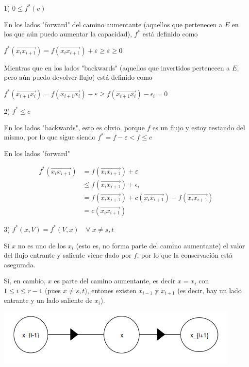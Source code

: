 \documentclass[10pt,a4paper]{article}
\begin{document}
1) $0 \leq f^* (v)$

En los lados "forward" del camino aumentante (aquellos que pertenecen a $E$ en los que aún puedo aumentar la capacidad), $f^*$ está definido como

\begin{center}
$f^*(\overrightarrow{x_ix_{i+1}}) = f(\overrightarrow{x_ix_{i+1}})+\varepsilon \geq \varepsilon \geq 0 $
\end{center}

Mientras que en los lados "backwards" (aquellos que invertidos pertenecen a $E$, pero aún puedo devolver flujo) está definido como

\begin{center}
$f^*(\overrightarrow{x_{i+1}x_{i}}) = f(\overrightarrow{x_{i+1}x_{i}}) - \varepsilon \geq f(\overrightarrow{x_{i+1}x_{i}}) -\epsilon_i = 0$
\end{center}

2) $f^* \leq c$

En los lados "backwards", esto es obvio, porque $f$ es un flujo y estoy restando del mismo, por lo que sigue siendo $f^* = f - \varepsilon < f \leq c $

En los lados "forward"

\begin{center}
\begin{align*} f^*(\overrightarrow{x_ix_{i+1}}) &= f(\overrightarrow{x_ix_{i+1}}) + \varepsilon\\ &\leq f(\overrightarrow{x_ix_{i+1}}) + \epsilon_i\\ &= f(\overrightarrow{x_ix_{i+1}})+c(\overrightarrow{x_ix_{i+1}})-f(\overrightarrow{x_ix_{i+1}})\\ &= c(\overrightarrow{x_ix_{i+1}}) \end{align*}
\end{center}

3) $f^*(x, V) = f^*(V, x) \quad\forall\; x\neq s, t$

Si $x$ no es uno de los $x_i$ (esto es, no forma parte del camino aumentante) el valor del flujo entrante y saliente viene dado por $f$, por lo que la conservación está asegurada.

Si, en cambio, $x$ es parte del camino aumentante, es decir $x = x_i$ con $1 \leq i \leq r-1$ (pues $x \neq s, t$), entones existen $x_{i-1}$ y $x_{i+1}$ (es decir, hay un lado entrante y un lado saliente de $x_i$).

\begin{center}

    \begin{adjustbox}{max size={\textwidth}{\textheight}}
        \includegraphics{definitions/f_estrella_1.jpg}
        \end{adjustbox}
    
\end{center}
\end{document}
